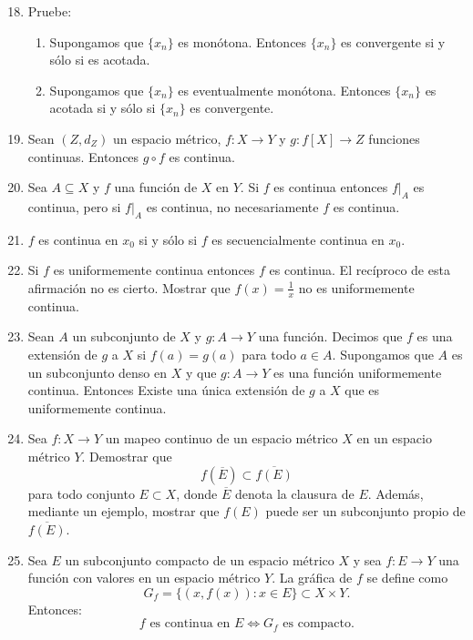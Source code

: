 \begin{enumerate}
    \setcounter{enumi}{17}
    \item Pruebe:
    \begin{enumerate}
        \item[a)] Supongamos que $\{x_n\}$ es monótona. Entonces $\{x_n\}$ es convergente si y sólo si es acotada.
        \item[b)] Supongamos que $\{x_n\}$ es eventualmente monótona. Entonces $\{x_n\}$ es acotada si y sólo si $\{x_n\}$ es convergente.
    \end{enumerate}
    
    \item Sean $(Z, d_Z)$ un espacio métrico, $f : X \to Y$ y $g : f[X] \to Z$ funciones continuas. Entonces $g \circ f$ es continua.
    
    \item Sea $A \subseteq X$ y $f$ una función de $X$ en $Y$. Si $f$ es continua entonces $f|_A$ es continua, pero si $f|_A$ es continua, no necesariamente $f$ es continua.
    
    \item $f$ es continua en $x_0$ si y sólo si $f$ es secuencialmente continua en $x_0$.
    
    \item Si $f$ es uniformemente continua entonces $f$ es continua. El recíproco de esta afirmación no es cierto. Mostrar que $f(x) = \frac{1}{x}$ no es uniformemente continua.
    
    \item Sean $A$ un subconjunto de $X$ y $g : A \to Y$ una función. Decimos que $f$ es una extensión de $g$ a $X$ si $f(a) = g(a)$ para todo $a \in A$. Supongamos que $A$ es un subconjunto denso en $X$ y que $g : A \to Y$ es una función uniformemente continua. Entonces Existe una única extensión de $g$ a $X$ que es uniformemente continua.
    
    \item Sea $f : X \to Y$ un mapeo continuo de un espacio métrico $X$ en un espacio métrico $Y$. Demostrar que
    \[ f(\overline{E}) \subset \overline{f(E)} \]
    para todo conjunto $E \subset X$, donde $\overline{E}$ denota la clausura de $E$.
    Además, mediante un ejemplo, mostrar que $f(E)$ puede ser un subconjunto propio de $\overline{f(E)}$.
    
    \item Sea $E$ un subconjunto compacto de un espacio métrico $X$ y sea $f : E \to Y$ una función con valores en un espacio métrico $Y$. La gráfica de $f$ se define como
    \[ G_f = \{(x, f(x)) : x \in E\} \subset X \times Y. \]
    Entonces:
    \[ f \text{ es continua en } E \iff G_f \text{ es compacto.} \]
    

\end{enumerate}
